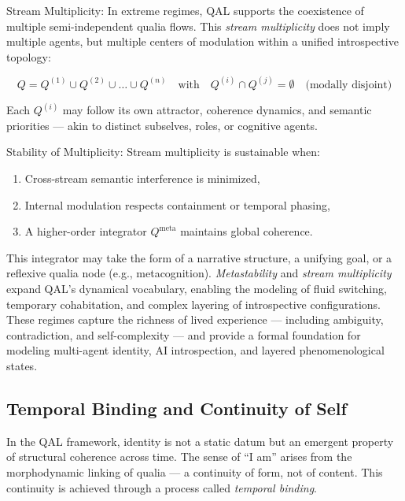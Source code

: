 \documentclass[11pt]{article}
\numberwithin{equation}{section} %
\begin{document}
\bigskip

\noindent Stream Multiplicity: 
In extreme regimes, QAL supports the coexistence of multiple semi-independent qualia flows. This \textit{stream multiplicity} does not imply multiple agents, but multiple centers of modulation within a unified introspective topology:

\begin{equation}
Q = Q^{(1)} \cup Q^{(2)} \cup \dots \cup Q^{(n)} \quad \text{with} \quad Q^{(i)} \cap Q^{(j)} = \emptyset \quad \text{(modally disjoint)}
\end{equation}

Each \( Q^{(i)} \) may follow its own attractor, coherence dynamics, and semantic priorities — akin to distinct subselves, roles, or cognitive agents.

\bigskip

\noindent Stability of Multiplicity:
Stream multiplicity is sustainable when:
\begin{enumerate}
  \item Cross-stream semantic interference is minimized,
  \item Internal modulation respects containment or temporal phasing,
  \item A higher-order integrator \( Q^{\text{meta}} \) maintains global coherence.
\end{enumerate}

This integrator may take the form of a narrative structure, a unifying goal, or a reflexive qualia node (e.g., metacognition). \textit{Metastability} and \textit{stream multiplicity} expand QAL’s dynamical vocabulary, enabling the modeling of fluid switching, temporary cohabitation, and complex layering of introspective configurations. These regimes capture the richness of lived experience — including ambiguity, contradiction, and self-complexity — and provide a formal foundation for modeling multi-agent identity, AI introspection, and layered phenomenological states.

\subsection{Temporal Binding and Continuity of Self}

In the QAL framework, identity is not a static datum but an emergent property of structural coherence across time. The sense of “I am” arises from the morphodynamic linking of qualia — a continuity of form, not of content. This continuity is achieved through a process called \textit{temporal binding}.
\end{document}
